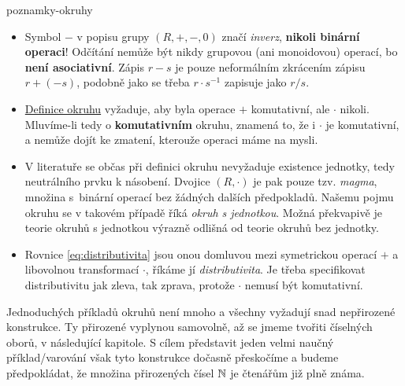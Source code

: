 \begin{remark}{}{poznamky-okruhy}
 \vspace{-\parskip}
 \begin{itemize}
  \item Symbol $-$ v popisu grupy $(R,+,-,0)$ značí \emph{inverz},
   \textbf{nikoli binární operaci}! Odčítání nemůže být nikdy grupovou (ani
   monoidovou) operací, bo \textbf{není asociativní}. Zápis $r - s$ je pouze
   neformálním zkrácením zápisu $r + (-s)$, podobně jako se třeba $r \cdot
   s^{-1}$ zapisuje jako $r / s$.
  \item \hyperref[def:okruh]{Definice okruhu} vyžaduje, aby byla operace $+$
   komutativní, ale $ \cdot $ nikoli. Mluvíme-li tedy o \textbf{komutativním}
   okruhu, znamená to, že i $ \cdot $ je komutativní, a nemůže dojít ke zmatení,
   kterouže operaci máme na mysli.
  \item V literatuře se občas při definici okruhu nevyžaduje existence jednotky,
   tedy neutrálního prvku k násobení. Dvojice $(R, \cdot )$ je pak pouze tzv.
   \emph{magma}, množina s~binární operací bez žádných dalších předpokladů.
   Našemu pojmu okruhu se v takovém případě říká \emph{okruh s jednotkou}. Možná
   překvapivě je teorie okruhů s jednotkou výrazně odlišná od teorie okruhů bez
   jednotky.
  \item Rovnice \eqref{eq:distributivita} jsou onou  domluvou mezi
   symetrickou operací $+$ a libovolnou transformací $ \cdot $, říkáme jí
   \emph{distributivita}. Je třeba specifikovat distributivitu jak zleva, tak
   zprava, protože $ \cdot $ nemusí být komutativní.
 \end{itemize}
\end{remark}

Jednoduchých příkladů okruhů není mnoho a všechny vyžadují snad nepřirozené
konstrukce. Ty přirozené vyplynou samovolně, až se jmeme tvořiti číselných
oborů, v následující kapitole. S cílem představit jeden velmi naučný
příklad/varování však tyto konstrukce dočasně přeskočíme a budeme předpokládat,
že množina přirozených čísel $\mathbb{N}$ je čtenářům již plně známa.

